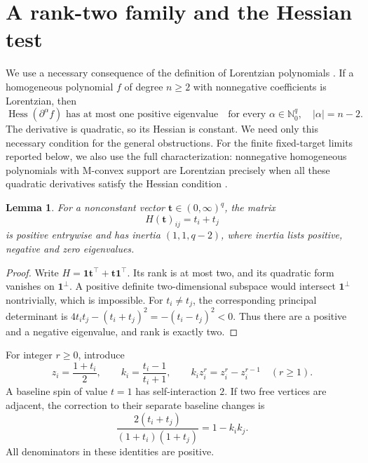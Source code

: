 \documentclass[11pt]{article}
\newtheorem{lemma}[theorem]{Lemma}
\theoremstyle{remark}
\DeclareMathOperator{\Hess}{Hess}
\newcommand{\one}{\mathbf 1}
\newcommand{\dd}{\partial}
\begin{document}
\section{A rank-two family and the Hessian test}
We use a necessary consequence of the definition of Lorentzian
polynomials \cite{BH}. If a homogeneous polynomial $f$ of degree
$n\geq2$ with nonnegative coefficients is Lorentzian, then
\begin{equation}
 \Hess(\dd^\alpha f)\text{ has at most one positive eigenvalue}
 \quad\text{for every }\alpha\in\mathbb N_0^q,\quad|\alpha|=n-2.
                                                        \label{eq:test}
\end{equation}
The derivative is quadratic, so its Hessian is constant. We need
only this necessary condition for the general obstructions.
For the finite fixed-target limits reported below, we also use the
full characterization: nonnegative homogeneous polynomials with
M-convex support are Lorentzian precisely when all these quadratic
derivatives satisfy the Hessian condition \cite[Theorem 2.25]{BH}.

\begin{lemma}\label{lem:target}
For a nonconstant vector $\mathbf t\in(0,\infty)^q$, the matrix
\begin{equation}
 H(\mathbf t)_{ij}=t_i+t_j                              \label{eq:H}
\end{equation}
is positive entrywise and has inertia $(1,1,q-2)$, where inertia lists
positive, negative and zero eigenvalues.
\end{lemma}
\begin{proof}
Write $H=\one\mathbf t^\top+\mathbf t\one^\top$.
Its rank is at most two, and its quadratic form vanishes on
$\one^\perp$. A positive definite two-dimensional subspace would
intersect $\one^\perp$ nontrivially, which is impossible.
For $t_i\ne t_j$, the corresponding principal determinant is
$4t_it_j-(t_i+t_j)^2=-(t_i-t_j)^2<0$. Thus there are a positive and a
negative eigenvalue, and rank is exactly two.
\end{proof}

For integer $r\geq0$, introduce
\begin{equation}
 z_i=\frac{1+t_i}{2},\qquad
 k_i=\frac{t_i-1}{t_i+1},\qquad
 k_i z_i^r=z_i^r-z_i^{r-1}\quad(r\geq1).
                                                        \label{eq:zk}
\end{equation}
A baseline spin of value $t=1$ has self-interaction $2$.
If two free vertices are adjacent, the correction to their separate
baseline changes is
\begin{equation}
 \frac{2(t_i+t_j)}{(1+t_i)(1+t_j)}=1-k_i k_j.
                                                        \label{eq:correction}
\end{equation}
All denominators in these identities are positive.
\end{document}
